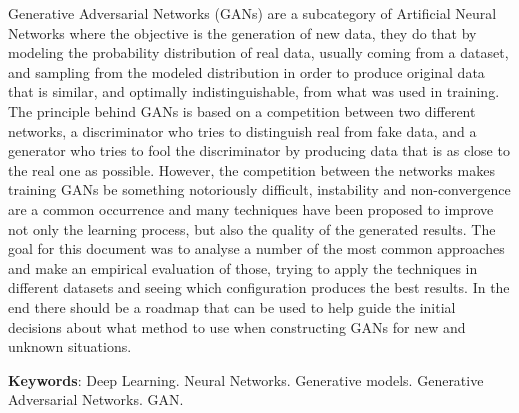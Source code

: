 \setlength{\absparsep}{18pt} %

\begin{resumo}
	\SingleSpacing
	Generative Adversarial Networks (GANs) are a subcategory of Artificial Neural Networks where the objective is the generation of new data, they do that by modeling the probability distribution of real data, usually coming from a dataset, and sampling from the modeled distribution in order to produce original data that is similar, and optimally indistinguishable, from what was used in training.
	The principle behind GANs is based on a competition between two different networks, a discriminator who tries to distinguish real from fake data, and a generator who tries to fool the discriminator by producing data that is as close to the real one as possible.
	However, the competition between the networks makes training GANs be something notoriously difficult, instability and non-convergence are a common occurrence and many techniques have been proposed to improve not only the learning process, but also the quality of the generated results.
	The goal for this document was to analyse a number of the most common approaches and make an empirical evaluation of those, trying to apply the techniques in different datasets and seeing which configuration produces the best results. In the end there should be a roadmap that can be used to help guide the initial decisions about what method to use when constructing GANs for new and unknown situations.
	
	\textbf{Keywords}: Deep Learning. Neural Networks. Generative models. Generative Adversarial Networks. GAN.
\end{resumo}



